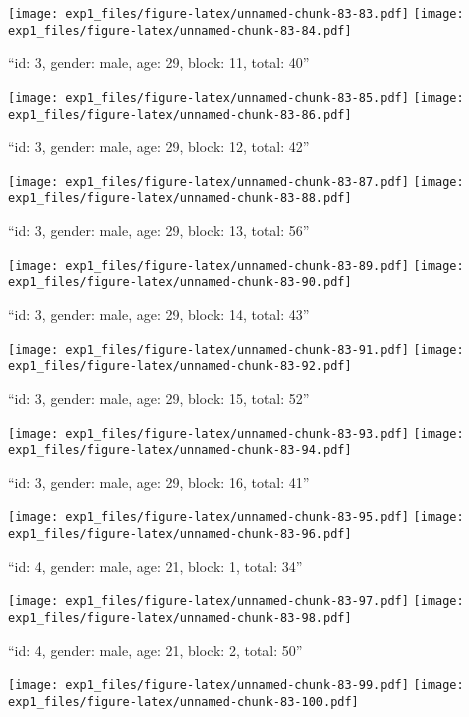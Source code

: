 \documentclass[11pt,,]{article}
\begin{document}
\texttt{[image: exp1\_files/figure-latex/unnamed-chunk-83-83.pdf]}
\texttt{[image: exp1\_files/figure-latex/unnamed-chunk-83-84.pdf]}

\newpage
[1] 

``id: 3, gender: male, age: 29, block: 11, total: 40''

\texttt{[image: exp1\_files/figure-latex/unnamed-chunk-83-85.pdf]}
\texttt{[image: exp1\_files/figure-latex/unnamed-chunk-83-86.pdf]}

\newpage
[1] 

``id: 3, gender: male, age: 29, block: 12, total: 42''

\texttt{[image: exp1\_files/figure-latex/unnamed-chunk-83-87.pdf]}
\texttt{[image: exp1\_files/figure-latex/unnamed-chunk-83-88.pdf]}

\newpage
[1] 

``id: 3, gender: male, age: 29, block: 13, total: 56''

\texttt{[image: exp1\_files/figure-latex/unnamed-chunk-83-89.pdf]}
\texttt{[image: exp1\_files/figure-latex/unnamed-chunk-83-90.pdf]}

\newpage
[1] 

``id: 3, gender: male, age: 29, block: 14, total: 43''

\texttt{[image: exp1\_files/figure-latex/unnamed-chunk-83-91.pdf]}
\texttt{[image: exp1\_files/figure-latex/unnamed-chunk-83-92.pdf]}

\newpage
[1] 

``id: 3, gender: male, age: 29, block: 15, total: 52''

\texttt{[image: exp1\_files/figure-latex/unnamed-chunk-83-93.pdf]}
\texttt{[image: exp1\_files/figure-latex/unnamed-chunk-83-94.pdf]}

\newpage
[1] 

``id: 3, gender: male, age: 29, block: 16, total: 41''

\texttt{[image: exp1\_files/figure-latex/unnamed-chunk-83-95.pdf]}
\texttt{[image: exp1\_files/figure-latex/unnamed-chunk-83-96.pdf]}

\newpage
[1] 

``id: 4, gender: male, age: 21, block: 1, total: 34''

\texttt{[image: exp1\_files/figure-latex/unnamed-chunk-83-97.pdf]}
\texttt{[image: exp1\_files/figure-latex/unnamed-chunk-83-98.pdf]}

\newpage
[1] 

``id: 4, gender: male, age: 21, block: 2, total: 50''

\texttt{[image: exp1\_files/figure-latex/unnamed-chunk-83-99.pdf]}
\texttt{[image: exp1\_files/figure-latex/unnamed-chunk-83-100.pdf]}
\end{document}
